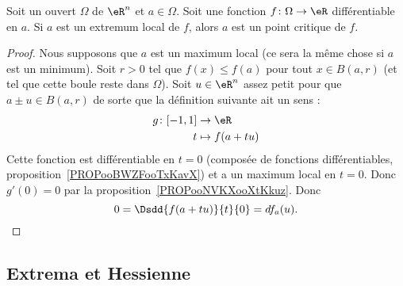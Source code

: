 \begin{proposition} \label{PropUQRooPgJsuz}
    Soit un ouvert \( \Omega\) de \( \eR^n\) et \( a\in \Omega\). Soit une fonction \( f\colon \Omega\to \eR\) différentiable en \( a\). Si \( a\) est un extremum local de \( f\), alors \( a\) est un point critique de \( f\).
\end{proposition}

\begin{proof}
    Nous supposons que \( a\) est un maximum local (ce sera la même chose si \( a\) est un minimum). Soit \( r>0\) tel que \( f(x)\leq f(a)\) pour tout \( x\in B(a,r)\) (et tel que cette boule reste dans \( \Omega\)). Soit \( u\in \eR^n\) assez petit pour que \( a\pm u\in B(a,r)\) de sorte que la définition suivante ait un sens :
    \begin{equation}
        \begin{aligned}
            g\colon \mathopen[ -1 , 1 \mathclose]&\to \eR \\
            t&\mapsto f(a+tu)
        \end{aligned}
    \end{equation}
    Cette fonction est différentiable en \( t=0\) (composée de fonctions différentiables, proposition~\ref{PROPooBWZFooTxKavX}) et a un maximum local en \( t=0\). Donc \( g'(0)=0\) par la proposition~\ref{PROPooNVKXooXtKkuz}. Donc
    \begin{equation}
        0=\Dsdd{ f(a+tu) }{t}{0}=df_a(u).
    \end{equation}
\end{proof}

\subsection{Extrema et Hessienne}

